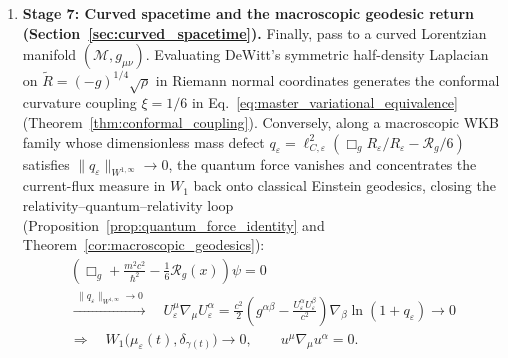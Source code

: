 \documentclass[11pt, a4paper]{article}
\theoremstyle{definition}
\begin{document}
\begin{enumerate}[label=\textbf{\arabic*.}, leftmargin=0.95cm, itemsep=0.55em]
    \item \textbf{Stage 7: Curved spacetime and the macroscopic geodesic return (Section~\ref{sec:curved_spacetime}).} Finally, pass to a curved Lorentzian manifold $(\mathcal{M}, g_{\mu\nu})$. Evaluating DeWitt's symmetric half-density Laplacian on $\tilde{R} = (-g)^{1/4}\sqrt{\rho}$ in Riemann normal coordinates generates the conformal curvature coupling $\xi = 1/6$ in Eq.~\eqref{eq:master_variational_equivalence} (Theorem~\ref{thm:conformal_coupling}). Conversely, along a macroscopic WKB family whose dimensionless mass defect $q_\varepsilon = \ell_{C,\varepsilon}^2(\Box_g R_\varepsilon/R_\varepsilon - \mathcal{R}_g/6)$ satisfies $\|q_\varepsilon\|_{W^{1,\infty}} \to 0$, the quantum force vanishes and concentrates the current-flux measure in $W_1$ back onto classical Einstein geodesics, closing the relativity--quantum--relativity loop (Proposition~\ref{prop:quantum_force_identity} and Theorem~\ref{cor:macroscopic_geodesics}):
    \begin{gather*}
    \left(\Box_g + \frac{m^2 c^2}{\hbar^2} - \frac{1}{6}\mathcal{R}_g(x)\right)\psi = 0 \\
    \xrightarrow{\;\|q_\varepsilon\|_{W^{1,\infty}} \to 0\;}\quad
    U_\varepsilon^\mu\nabla_\mu U_\varepsilon^\alpha = \frac{c^2}{2}\!\left(g^{\alpha\beta} - \frac{U_\varepsilon^\alpha U_\varepsilon^\beta}{c^2}\right)\nabla_\beta\ln(1 + q_\varepsilon) \longrightarrow 0 \\
    \Longrightarrow\quad W_1\big(\mu_\varepsilon(t), \delta_{\gamma(t)}\big) \longrightarrow 0, \qquad u^\mu\nabla_\mu u^\alpha = 0.
    \end{gather*}
\end{enumerate}
\end{document}
